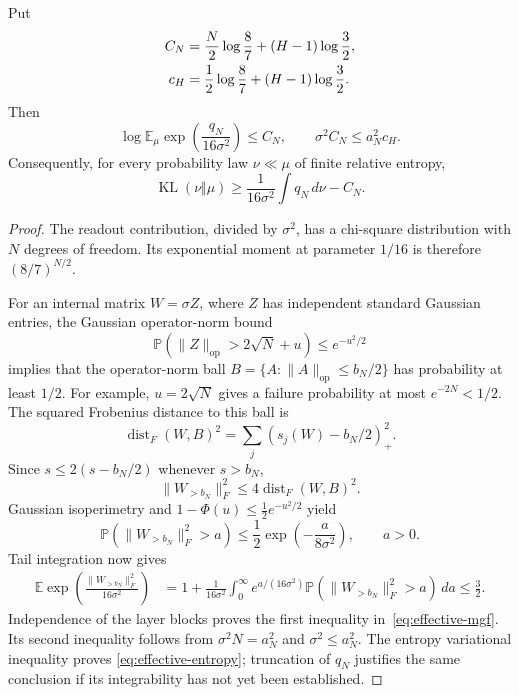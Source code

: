 \begin{lemma}
\label{lem:effective-mgf}
Put
\begin{align}
 C_N&=\frac N2\log\frac87+(H-1)\log\frac32,
 \notag\\
 c_H&=\frac12\log\frac87+(H-1)\log\frac32.
 \label{eq:effective-mgf-constant}
\end{align}
Then
\begin{equation}
 \log\mathbb E_\mu\exp\left(\frac{q_N}{16\sigma^2}\right)
 \leq C_N,
 \qquad \sigma^2 C_N\leq a_N^2c_H.
 \label{eq:effective-mgf}
\end{equation}
Consequently, for every probability law $\nu\ll\mu$ of finite
relative entropy,
\begin{equation}
 \operatorname{KL}(\nu\Vert\mu)
 \geq\frac1{16\sigma^2}\int q_N\,d\nu-C_N.
 \label{eq:effective-entropy}
\end{equation}
\end{lemma}
\begin{proof}
The readout contribution, divided by $\sigma^2$,
has a chi-square distribution with $N$ degrees of freedom.
Its exponential moment at parameter $1/16$ is therefore
$(8/7)^{N/2}$.

For an internal matrix $W=\sigma Z$, where $Z$ has independent standard
Gaussian entries, the Gaussian operator-norm bound
\[
 \mathbb P(\|Z\|_{\mathrm{op}}>2\sqrt N+u)\leq e^{-u^2/2}
\]
implies that the operator-norm ball
$B=\{A:\|A\|_{\mathrm{op}}\leq b_N/2\}$ has probability at least
$1/2$.  For example, $u=2\sqrt N$ gives a failure probability at
most $e^{-2N}<1/2$.  The squared Frobenius distance to this ball is
\[
 \operatorname{dist}_F(W,B)^2
   =\sum_j(s_j(W)-b_N/2)_+^2.
\]
Since $s\leq2(s-b_N/2)$ whenever $s>b_N$,
\[
 \|W_{>b_N}\|_F^2\leq4\operatorname{dist}_F(W,B)^2.
\]
Gaussian isoperimetry and $1-\Phi(u)\leq\tfrac12e^{-u^2/2}$ yield
\begin{equation}
 \mathbb P(\|W_{>b_N}\|_F^2>a)
 \leq\frac12\exp\left(-\frac a{8\sigma^2}\right),
 \qquad a>0.
 \label{eq:effective-internal-tail}
\end{equation}
Tail integration now gives
\begin{align*}
 \mathbb E\exp\left(\frac{\|W_{>b_N}\|_F^2}{16\sigma^2}\right)
 &=1+\frac1{16\sigma^2}\int_0^\infty
      e^{a/(16\sigma^2)}
      \mathbb P(\|W_{>b_N}\|_F^2>a)\,da
 \leq\frac32.
\end{align*}
Independence of the layer blocks proves the first inequality
in~\eqref{eq:effective-mgf}.  Its second inequality follows from $\sigma^2N=a_N^2$
and $\sigma^2\leq a_N^2$.
The entropy variational inequality proves
\eqref{eq:effective-entropy}; truncation of $q_N$ justifies the same
conclusion if its integrability has not yet been established.
\end{proof}

